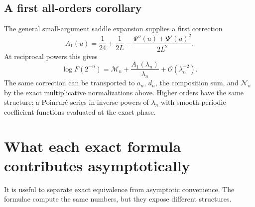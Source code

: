 \documentclass[11pt,oneside]{article}
\theoremstyle{definition}
\theoremstyle{remark}
\newcommand{\bigO}{\mathcal O}
\begin{document}
\subsection{A first all-orders corollary}

The general small-argument saddle expansion supplies a first correction
\begin{equation}
 A_1(u)=\frac1{24}+\frac1{2L}
 -\frac{\Psi''(u)+\Psi'(u)^2}{2L^2}.                        \label{dyadicasym:eq:A1-report}
\end{equation}
At reciprocal powers this gives
\begin{equation}
 \log F(2^{-n})=\mathcal M_n+
 \frac{A_1(\lambda_n)}{\lambda_n}+
 \bigO(\lambda_n^{-2}).                                    \label{dyadicasym:eq:first-correction-dyadic}
\end{equation}
The same correction can be transported to $a_n$, $d_n$, the composition sum, and
$\mathcal N_n$ by the exact multiplicative normalizations above.  Higher orders have the same
structure: a Poincar\'e series in inverse powers of $\lambda_n$ with smooth periodic
coefficient functions evaluated at the exact phase.

\section{What each exact formula contributes asymptotically}
\label{dyadicasym:sec:formula-audit}

It is useful to separate exact equivalence from asymptotic convenience.  The formulae compute
the same numbers, but they expose different structures.
\end{document}
